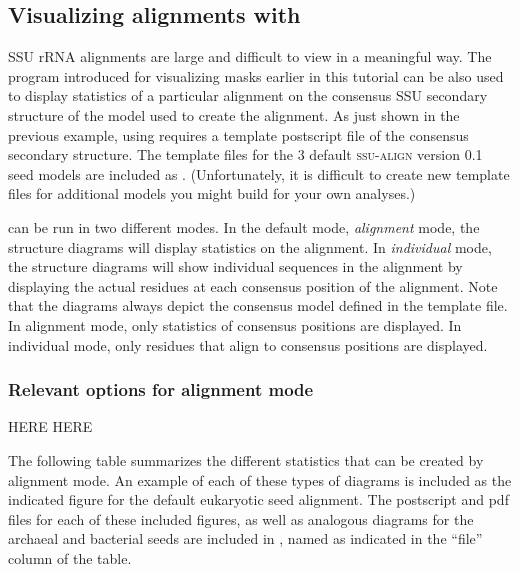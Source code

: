 \subsection{Visualizing alignments with }

SSU rRNA alignments are large and difficult to view in a meaningful
way. The  program introduced for visualizing masks
earlier in this tutorial can be also used to display statistics of
a particular alignment on the consensus SSU secondary structure of the
model used to create the alignment. As just shown in the previous example,
using  requires a template postscript file of the
consensus secondary structure. The template files for the 3 default
\textsc{ssu-align} version 0.1 seed models are included as
. 
(Unfortunately, it is difficult to create new template files for
additional models you might build for your own analyses.) 

 can be run in two different modes. In the default
mode, \emph{alignment} mode, the structure diagrams will display
statistics on the alignment. In \emph{individual} mode, the structure
diagrams will show individual sequences in the alignment by displaying
the actual residues at each consensus position of the alignment. Note
that the diagrams always depict the consensus model defined in the
template file. In alignment mode, only statistics of consensus
positions are displayed. In individual mode, only residues that align to
consensus positions are displayed.

\subsubsection{Relevant options for alignment mode}

HERE HERE 

The following table summarizes the different statistics that can be
created by  alignment mode.
An example of each of these types of
diagrams is included as the indicated figure for the default
eukaryotic seed alignment. The postscript and pdf files for each of
these included figures, as well as analogous diagrams for the
archaeal and bacterial seeds are included in 
, named as indicated 
in the ``file'' column of the table. 

